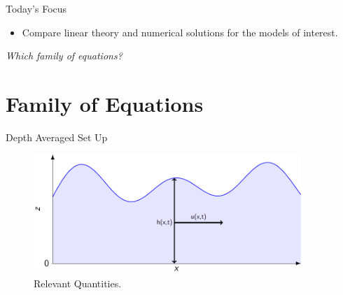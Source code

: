 \documentclass[pdf]{beamer}
\begin{document}
\begin{frame}{Today's Focus}
\begin{itemize}
	\item Compare linear theory and numerical solutions for the models of interest.
\end{itemize}
\bigskip
\pause
\emph{Which family of equations?}
\end{frame}


\section{Family of Equations}
\begin{frame}{Depth Averaged Set Up}
\begin{figure}
	\centering
	\includegraphics[width=0.9\textwidth]{./Pics/Tex/Explanatory/Setupplot/Waves.pdf}
	\caption{Relevant Quantities.}
\end{figure}
\end{frame}
\end{document}

